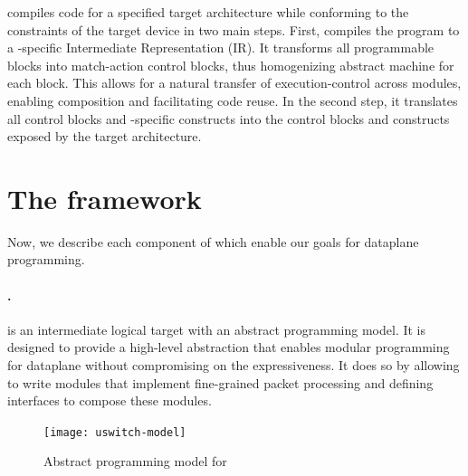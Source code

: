 \documentclass[letterpaper,twocolumn,10pt]{article}
\begin{document}
\ucomp compiles \ulang code for a specified target architecture
while conforming to the constraints of the target device in two main steps.
First, \ucomp compiles the program to a \uarch-specific Intermediate
Representation (IR). It transforms all programmable blocks into
match-action control blocks, thus homogenizing abstract machine for
each block. This allows for a natural transfer of execution-control
across modules, enabling composition and facilitating code reuse.
In the second step, it translates all control blocks and
\uarch-specific constructs into the control blocks and constructs
exposed by the target architecture.




\section{The \ulang framework}
\label{sec:microp4}
Now, we describe each component of \ulang which enable our goals for
dataplane programming.

\paragraph{\uswitch.}
\uswitch is an intermediate logical target with an abstract
programming model. It is designed to provide a high-level abstraction
that enables modular programming for dataplane without compromising on
the expressiveness.  It does so by allowing to write modules that
implement fine-grained packet processing and defining interfaces to
compose these modules.
\begin{figure}[htb]
    \centering
    \texttt{[image: uswitch-model]}
    \caption{Abstract programming model for \uswitch}
    \label{fig:uswitch}
\end{figure}
\end{document}
